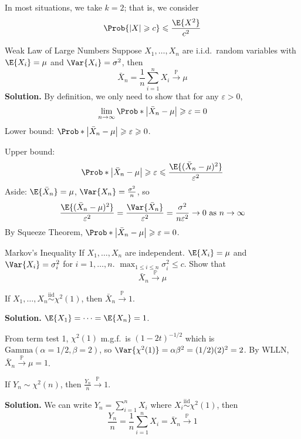 In most situations, we take $ k=2 $; that is, we consider
\[ \Prob{\abs{X}\geqslant c}\leqslant \frac{\E{X^2}}{c^2} \]
\begin{Example}{Weak Law of Large Numbers}{}
    Suppose $ X_1,\ldots,X_n $ are i.i.d.\ random variables
    with $ \E{X_i}=\mu $ and $ \Var{X_i}=\sigma^2 $, then
    \[ \bar{X}_n=\frac{1}{n} \sum_{i=1}^{n} X_i\stackrel{\mathbb{P}}{\to}\mu \]
    \textbf{Solution.} By definition, we only need to show that
    for any $ \varepsilon>0 $,
    \[ \lim\limits_{{n} \to {\infty}} \Prob*{\abs*{\bar{X}_n-\mu}\geqslant \varepsilon}=0 \]
    Lower bound: $ \Prob*{\abs*{\bar{X}_n-\mu}\geqslant \varepsilon}\geqslant 0 $.

    Upper bound:
    \[ \Prob*{\abs*{\bar{X}_n-\mu}\geqslant \varepsilon}\leqslant
        \frac{\E{(\bar{X}_n-\mu)^2}}{\varepsilon^2}  \]
    Aside: $ \E{\bar{X}_n}=\mu $, $ \Var{X_n}=\frac{\sigma^2}{n} $, so
    \[ \frac{\E{(\bar{X}_n-\mu)^2}}{\varepsilon^2}=
        \frac{\Var{\bar{X}_n}}{\varepsilon^2}=
        \frac{\sigma^2}{n\varepsilon^2}\to 0\text{ as }n\to\infty   \]
    By Squeeze Theorem, $ \Prob*{\abs*{\bar{X}_n-\mu}\geqslant \varepsilon}=0 $.
\end{Example}
\begin{Exercise}{Markov's Inequality}{}
    If $ X_1,\ldots,X_n $ are independent. $ \E{X_i}=\mu $
    and $ \Var{X_i}=\sigma_i^2 $ for $ i=1,\ldots,n $.
    $ \max_{1\leqslant i\leqslant n}\sigma_i^2\leqslant c $.
    Show that
    \[ \bar{X}_n\stackrel{\mathbb{P}}{\to}\mu \]
\end{Exercise}
\begin{Example}{}{}
    If $ X_1,\ldots,X_n\stackrel{\text{iid}}{\sim}\chi^2(1) $,
    then $ \bar{X}_n\stackrel{\mathbb{P}}{\to}1 $.

    \textbf{Solution.} $ \E{X_1}=\cdots=\E{X_n}=1 $.

    From term test 1,
    $ \chi^2(1) $ m.g.f.\ is $ (1-2t)^{-1/2} $
    which is $ \text{Gamma}(\alpha=1/2,\beta=2) $,
    so $ \Var{\chi^2(1)}=\alpha\beta^2=(1/2)(2)^2=2 $. By
    WLLN, $ \bar{X}_n\stackrel{\mathbb{P}}{\to}\mu=1 $.
\end{Example}
\begin{Example}{}{}
    If $ Y_n \sim \chi^2(n) $, then $ \displaystyle \frac{Y_n}{n}
        \stackrel{\mathbb{P}}{\to} 1 $.

    \textbf{Solution.} We can write
    $ Y_n=\sum_{i=1}^{n} X_i $ where $ X_i\stackrel{\text{iid}}{\sim}\chi^2(1) $,
    then
    \[ \frac{Y_n}{n}=\frac{1}{n} \sum_{i=1}^{n} X_i=\bar{X}_n
        \stackrel{\mathbb{P}}{\to}1 \]
\end{Example}
